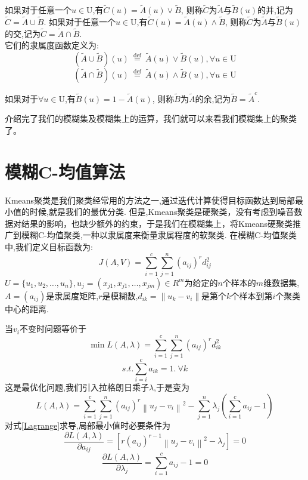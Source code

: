 \begin{definition}
    如果对于任意一个$u \in \mathrm{U}$,有$\tilde{C}(u)=\tilde{A}(u) \vee \tilde{B}$,
    则称$\tilde{C}$为$\tilde{A}$与$\tilde{B}(u)$的并,记为$\tilde{C}=\tilde{A} \cup \tilde{B}$.
    如果对于任意一个$u \in \mathrm{U}$,有$\tilde{C}(u)=\tilde{A}(u) \wedge \tilde{B}$,
    则称$\tilde{C}$为$\tilde{A}$与$\tilde{B}(u)$的交,记为$\tilde{C}=\tilde{A} \cap \tilde{B}$.\\
    它们的隶属度函数定义为:
    \[
        (\tilde{A}\cup  \tilde{B})(u) \stackrel{\text { def }}{=}\tilde{A}(u) \vee \tilde{B}(u) , \forall u \in \mathrm{U}
    \]
    \[
        (\tilde{A}\cap   \tilde{B})(u) \stackrel{\text { def }}{=}\tilde{A}(u) \wedge \tilde{B}(u) ,\forall u \in \mathrm{U}
    \]
\end{definition}
\begin{definition}
    如果对于$\forall u \in \mathrm{U}$,有$\tilde{B}(u)=1-\tilde{A}(u) $,
    则称$\tilde{B}$为$\tilde{A}$的余,记为$\tilde{B}=\tilde{A}^c$.
\end{definition}
介绍完了我们的模糊集及模糊集上的运算，我们就可以来看我们模糊集上的聚类了。
\section{模糊C-均值算法}
Kmeans聚类是我们聚类经常用的方法之一,通过迭代计算使得目标函数达到局部最小值的时候,就是我们的最优分类.
但是,Kmeans聚类是硬聚类，没有考虑到噪音数据对结果的影响，也缺少额外的约束，于是我们在模糊集上，将Kmeans硬聚类推广到模糊C-均值聚类,一种以隶属度来衡量隶属程度的软聚类.
在模糊C-均值聚类中,我们定义目标函数为:
\begin{equation}
    J(A, V)=\sum_{i=1}^{c} \sum_{j=1}^{n}\left(a_{i j}\right)^{r} d_{i j}^2
\end{equation}
$U=\{u_1,u_2,\dots,u_n\},u_j=(x_{j1},x_{j1},\dots,x_{jm})\in R^m$为给定的$n$个样本的$m$维数据集,
$A=(a_{i j})$是隶属度矩阵,$r$是模糊数,$d_{i k}=\| u_k-v_i\|$是第个$k$个样本到第$i$个聚类中心的距离.
\par
当$v_i$不变时问题等价于
\begin{equation}
    \min L(A, \lambda)=\sum_{i=1}^{c} \sum_{j=1}^{n}\left(a_{i j}\right)^{r}d_{i k}^2
\end{equation}
\begin{equation}
    s.t.  \sum_{i=i}^c a_{i k}=1.\  \forall k
\end{equation}
这是最优化问题,我们引入拉格朗日乘子$\lambda$,于是变为
\begin{equation}
    L(A, \lambda)=\sum_{i=1}^{c} \sum_{j=1}^{n}\left(a_{i j}\right)^{r}\left\|u_{j}-v_{i}\right\|^{2}-\sum_{j=1}^{n} \lambda_{j}\left(\sum_{i=1}^{c} a_{i j}-1\right)
    \label{Lagrange}
\end{equation}
对式\ref{Lagrange}求导,局部最小值时必要条件为
\begin{equation}
    \frac{\partial L(A, \lambda)}{\partial a_{i j}}=\left[r\left(a_{i j}\right)^{r-1}\left\|u_{j}-v_{i}\right\|^{2}-\lambda_{j}\right]=0
    \label{dLdAij}
\end{equation}
\begin{equation}
    \frac{\partial L(A, \lambda)}{\partial \lambda_{j}}=\sum_{i=1}^{c} a_{i j}-1=0
    \label{dLdLamda}
\end{equation}

